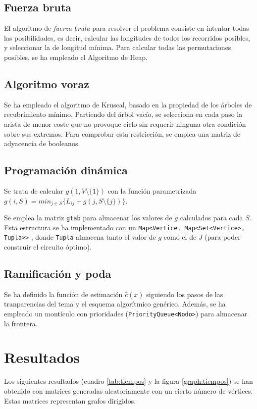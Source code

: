 \documentclass{article}
\begin{document}
\subsection*{Fuerza bruta}
El algoritmo de \emph{fuerza bruta} para resolver el problema consiste en
intentar todas las posibilidades, es decir, calcular las longitudes de todos
los recorridos posibles, y seleccionar la de longitud mínima.
Para calcular todas las permutaciones posibles, se ha empleado el Algoritmo de
Heap.

\subsection*{Algoritmo voraz}
Se ha empleado el algoritmo de Kruscal, basado en la propiedad de los árboles de
recubrimiento mínimo. Partiendo del árbol vacío, se selecciona en cada paso la
arista de menor coste que no provoque ciclo sin requerir ninguna otra condición
sobre sus extremos. Para comprobar esta restricción, se emplea una matriz de
adyacencia de booleanos.

\subsection*{Programación dinámica}
Se trata de calcular $g(1,V \setminus \{ 1 \})$ con la función parametrizada
    $g(i,S) = min_{j \in S} \{ L_{ij} + g(j, S \setminus \{ j \}  ) \}$.

Se emplea la matriz \texttt{gtab} para almacenar los valores de $g$ calculados
para cada $S$. Esta estructura se ha implementado con un
\texttt{Map\textless{}Vertice, Map\textless{}Set\textless{}Vertice\textgreater{}, Tupla\textgreater{}\textgreater{}}
, donde \texttt{Tupla} almacena tanto el valor de $g$ como el de $J$ (para poder construir el circuito óptimo).


\subsection*{Ramificación y poda}
Se ha definido la función de estimación $\hat{c}(x)$ siguiendo los pasos de las
tranparencias del tema y el esquema algorítmico genérico. Además, se ha empleado
un montículo con prioridades (\texttt{PriorityQueue<Nodo>}) para almacenar la
frontera.


\section{Resultados}
Los siguientes resultados (cuadro \ref{tab:tiempos} y la figura \ref{graph:tiempos})
se han obtenido con matrices generadas aleatoriamente con un cierto número de
vértices. Estas matrices representan grafos dirigidos.
\end{document}

